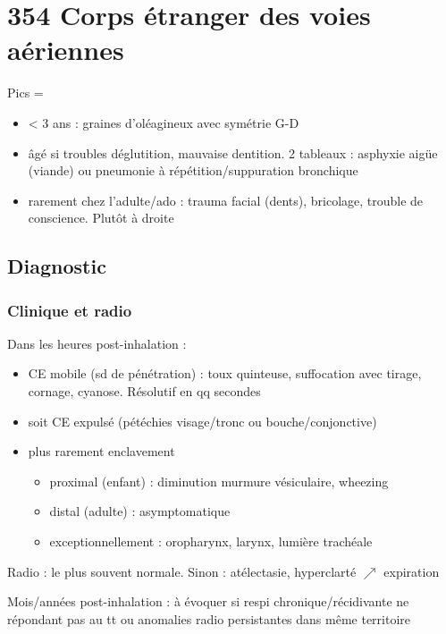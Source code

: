 \documentclass{book}
\begin{document}
\section{354 \textdagger{} Corps étranger des voies aériennes}
\label{sec:orgc61e96f}
\label{sec:354_corps_etranger_des_voies_aeriennes}

Pics = 

\begin{itemize}
\item < 3 ans : graines d'oléagineux avec symétrie G-D
\item âgé si troubles déglutition, mauvaise dentition. 2 tableaux : asphyxie
aigüe (viande) ou pneumonie à répétition/suppuration bronchique
\item rarement chez l'adulte/ado : trauma facial (dents), bricolage, trouble
de conscience. Plutôt à droite
\end{itemize}


\subsection{Diagnostic}
\label{sec:orgf5be5a4}
\subsubsection{Clinique et radio}
\label{sec:org0f18bbe}
Dans les heures post-inhalation :

\begin{itemize}
\item CE mobile (sd de pénétration) : toux quinteuse, suffocation avec tirage,
cornage, cyanose. Résolutif en qq secondes
\item soit CE expulsé (pétéchies visage/tronc ou bouche/conjonctive)
\item plus rarement enclavement 

\begin{itemize}
\item proximal (enfant) : diminution murmure vésiculaire, wheezing
\item distal (adulte) : asymptomatique
\item exceptionnellement : oropharynx, larynx, lumière trachéale
\end{itemize}
\end{itemize}


Radio : le plus souvent normale. Sinon : atélectasie, hyperclarté \(\nearrow\)
expiration

Mois/années post-inhalation : à évoquer si respi chronique/récidivante ne
répondant pas au tt ou anomalies radio persistantes dans même territoire
\end{document}

